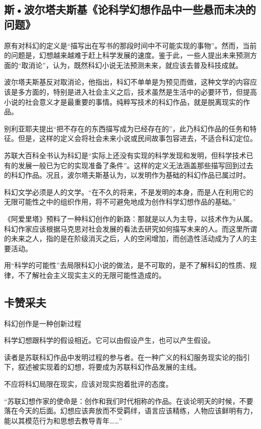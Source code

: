 \documentclass{ctexart}
\begin{document}
\subsection{斯•波尔塔夫斯基《论科学幻想作品中一些悬而未决的问题》}

原有对科幻的定义是“描写出在写书的那段时间中不可能实现的事物”。然而，当前的问题是，幻想越来越难于赶上科学发展的速度。鉴于此，一些人提出未来预测方面的“取消论”，认为，既然科幻小说无法预测未来，就应该去普及科技成就。

波尔塔夫斯基反对取消论，他指出，科幻不单单是为预见而做，这种文学的内容应该是多方面的，特别是进入社会主义之后，技术虽然是生活中的必要环节，但提高小说的社会意义才是最重要的事情。纯粹写技术的科幻作品，就是脱离现实的作品。

别利亚耶夫提出“把不存在的东西描写成为已经存在的”，此乃科幻作品的任务和特征。但是，这样的定义会将社会未来小说或民间故事包容进去，不适合科幻定位。

苏联大百科全书认为科幻是“实际上还没有实现的科学发现和发明，但科学技术已有的发展一般已为它的实现准备了条件”。这样的定义无法涵盖那些描写回到过去的科幻作品。况且，波尔塔夫斯基认为，以发明作为基础的科幻作品已属过时。

科幻文学必须是人的文学。“在不久的将来，不是发明的本身，而是人在利用它的无限可能性之中的组织作用，将不可避免地成为创作科学幻想作品的基础。”

《阿爱里塔》预料了一种科幻创作的新路：那就是以人为主导，以技术作为从属。科幻作家应该根据马克思对社会发展的看法去研究如何描写未来的人。而这里所谓的未来之人，指的是在阶级消灭之后，人的空闲增加，而创造性活动成为了人的主要活动。

用“科学的可能性”去局限科幻小说的做法，是不可取的，是不了解科幻的性质、规律，不了解社会主义现实主义的无限可能性造成的。




\subsection{卡赞采夫}

    科幻创作是一种创新过程

    科学幻想跟科学的假设相近。它可以由假设产生，也可以产生假设。

    读者是苏联科幻作品中发明过程的参与者。在一种广义的科幻服务现实论的指引下，叙述被实现着的幻想，将要成为苏联科幻作品发展的主线。

    不应将科幻局限在现实，应该对现实抱着批评的态度。

    “苏联幻想作家的使命是：创作和我们时代相称的作品。在谈论明天的时候，不要落在今天的后面。幻想应该奔放而不受羁绊，语言应该精练，人物应该鲜明有力，能以其模范行为和思想去教导青年……”
\end{document}
